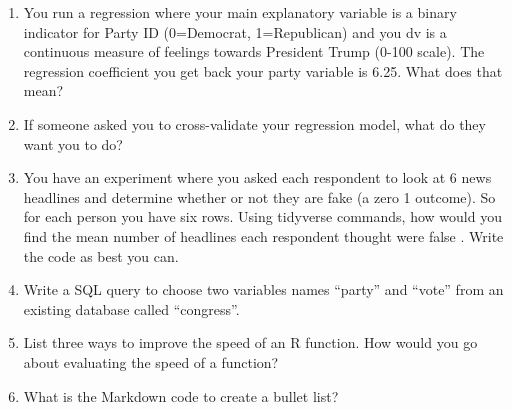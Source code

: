 \documentclass[11pt]{article}
\begin{document}
\flushleft
\begin{enumerate}
\item You run a regression where your main explanatory variable is a binary indicator for Party ID (0=Democrat, 1=Republican) and you dv is a continuous measure of feelings towards President Trump (0-100 scale). The regression coefficient you get back your party variable is 6.25.  What does that mean?\vspace{10mm}
\item If someone asked you to cross-validate your regression model, what do they want you to do? \vspace{15mm}
\item You have an experiment where you asked each respondent to look at 6 news headlines and determine whether or not they are fake (a zero 1 outcome).  So for each person you have six rows.  Using tidyverse commands, how would you find the mean number of headlines each respondent thought were false .  Write the code as best you can. \vspace{15mm}
\item Write a SQL query to choose two variables names ``party'' and ``vote'' from an existing database called ``congress''. \vspace{10mm}

\item List three ways to improve the speed of an R function.  How would you go about evaluating the speed of a function? \vspace{15mm}

\item What is the Markdown code to create a bullet list?


\end{enumerate}
\end{document}
